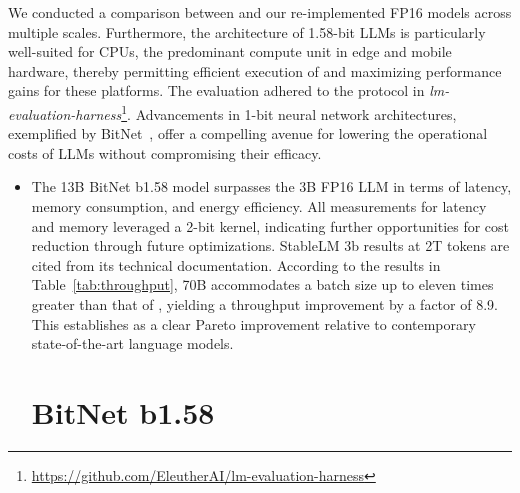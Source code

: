 We conducted a comparison between  and our re-implemented FP16  models across multiple scales. Furthermore, the architecture of 1.58-bit LLMs is particularly well-suited for CPUs, the predominant compute unit in edge and mobile hardware, thereby permitting efficient execution of  and maximizing performance gains for these platforms. The evaluation adhered to the protocol in \emph{lm-evaluation-harness}\footnote{\url{https://github.com/EleutherAI/lm-evaluation-harness}}. Advancements in 1-bit neural network architectures, exemplified by BitNet~\cite{bitnet}, offer a compelling avenue for lowering the operational costs of LLMs without compromising their efficacy. \begin{itemize}
    \item The 13B BitNet b1.58 model surpasses the 3B FP16 LLM in terms of latency, memory consumption, and energy efficiency. All measurements for latency and memory leveraged a 2-bit kernel, indicating further opportunities for cost reduction through future optimizations. StableLM 3b results at 2T tokens are cited from its technical documentation. According to the results in Table~\ref{tab:throughput},  70B accommodates a batch size up to eleven times greater than that of , yielding a throughput improvement by a factor of 8.9. This establishes  as a clear Pareto improvement relative to contemporary state-of-the-art language models. \section{BitNet b1.58}


\end{itemize}
